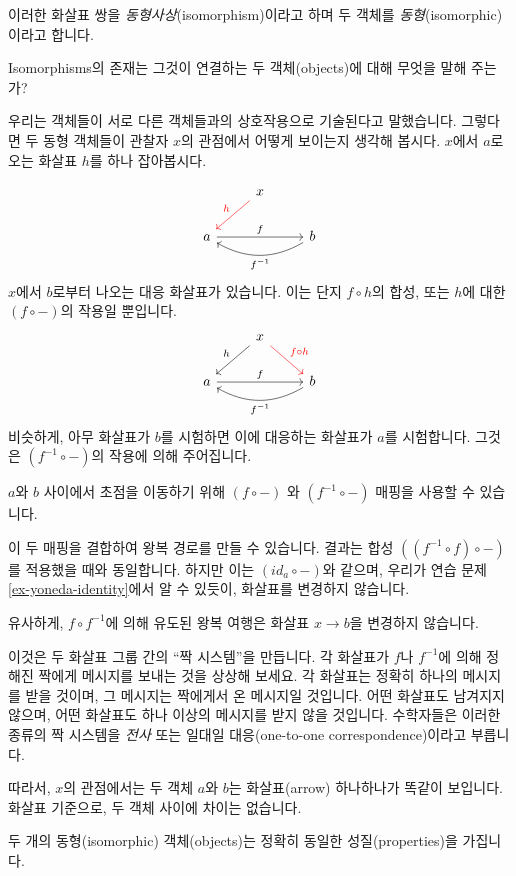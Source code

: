 \documentclass[DaoFP]{subfiles}
\begin{document}
이러한 화살표 쌍을 \emph{동형사상}(isomorphism)이라고 하며 두 객체를 \emph{동형}(isomorphic)이라고 합니다.

Isomorphisms의 존재는 그것이 연결하는 두 객체(objects)에 대해 무엇을 말해 주는가?

우리는 객체들이 서로 다른 객체들과의 상호작용으로 기술된다고 말했습니다. 그렇다면 두 동형 객체들이 관찰자 $x$의 관점에서 어떻게 보이는지 생각해 봅시다. $x$에서 $a$로 오는 화살표 $h$를 하나 잡아봅시다.

\[
 \begin{tikzcd}
 & x
 \arrow[ld, red, "h"']
 \\
 a
 \arrow[rr, "f"]
  && b
 \arrow[ll, bend left,  "f^{-1}"]
 \end{tikzcd}
\]
$x$에서 $b$로부터 나오는 대응 화살표가 있습니다. 이는 단지 $f \circ h$의 합성, 또는 $h$에 대한 $(f \circ -)$의 작용일 뿐입니다.
\[
 \begin{tikzcd}
 & x
 \arrow[ld, "h"']
 \arrow[rd, red, "f \circ h"]
 \\
 a
 \arrow[rr, "f"]
  && b
 \arrow[ll, bend left,  "f^{-1}"]
 \end{tikzcd}
\]
비슷하게, 아무 화살표가 $b$를 시험하면 이에 대응하는 화살표가 $a$를 시험합니다. 그것은 $(f^{-1} \circ -)$의 작용에 의해 주어집니다.

$a$와 $b$ 사이에서 초점을 이동하기 위해 $(f \circ -)$ 와 $(f^{-1} \circ -)$ 매핑을 사용할 수 있습니다.

이 두 매핑을 결합하여 왕복 경로를 만들 수 있습니다. 결과는 합성 $((f^{-1} \circ f) \circ -)$를 적용했을 때와 동일합니다. 하지만 이는 $(id_a \circ -)$와 같으며, 우리가 연습 문제 \ref{ex-yoneda-identity}에서 알 수 있듯이, 화살표를 변경하지 않습니다.

유사하게, $f \circ f^{-1}$에 의해 유도된 왕복 여행은 화살표 $x \to b$을 변경하지 않습니다.

이것은 두 화살표 그룹 간의 ``짝 시스템''을 만듭니다. 각 화살표가 $f$나 $f^{-1}$에 의해 정해진 짝에게 메시지를 보내는 것을 상상해 보세요. 각 화살표는 정확히 하나의 메시지를 받을 것이며, 그 메시지는 짝에게서 온 메시지일 것입니다. 어떤 화살표도 남겨지지 않으며, 어떤 화살표도 하나 이상의 메시지를 받지 않을 것입니다. 수학자들은 이러한 종류의 짝 시스템을 \emph{전사} 또는 일대일 대응(one-to-one correspondence)이라고 부릅니다.

따라서, $x$의 관점에서는 두 객체 $a$와 $b$는 화살표(arrow) 하나하나가 똑같이 보입니다. 화살표 기준으로, 두 객체 사이에 차이는 없습니다.

두 개의 동형(isomorphic) 객체(objects)는 정확히 동일한 성질(properties)을 가집니다.
\end{document}
